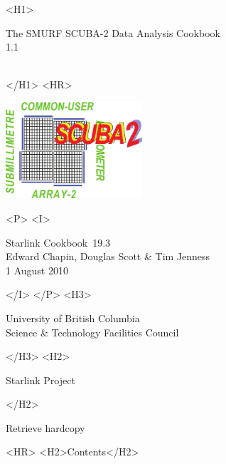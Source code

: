 \documentclass[twoside,11pt]{article}
\newcommand{\stardoccategory}  {Starlink Cookbook}
\newcommand{\stardocsource}    {sc\stardocnumber}
\newcommand{\stardocnumber}    {19.3}
\newcommand{\stardocauthors}   {Edward Chapin, Douglas Scott \& Tim Jenness}
\newcommand{\stardocdate}      {1 August 2010}
\newcommand{\stardoctitle}     {The SMURF SCUBA-2 Data Analysis Cookbook}
\newcommand{\stardocversion}   {1.1}
\newcommand{\stardocmanual}    {\ }
\newcommand{\htmladdnormallink}[2]{#1}
\newcommand{\htmladdimg}[1]{}
\newcommand{\htmlref}[2]{#1}
\newcommand{\htmladdtonavigation}[1]{}
\newcommand{\xlabel}[1]{}
\renewcommand{\_}{\texttt{\symbol{95}}}
\begin{document}
\begin{htmlonly}
   \xlabel{}
   \begin{rawhtml} <H1> \end{rawhtml}
      \stardoctitle\\
      \stardocversion\\
      \stardocmanual
   \begin{rawhtml} </H1> <HR> \end{rawhtml}

\includegraphics[width=2.0in]{sc19_logo}

   \begin{rawhtml} <P> <I> \end{rawhtml}
   \stardoccategory\ \stardocnumber \\
   \stardocauthors \\
   \stardocdate
   \begin{rawhtml} </I> </P> <H3> \end{rawhtml}
      \htmladdnormallink{University of British Columbia}
                        {http://www.ubc.ca} \\
      \htmladdnormallink{Science \& Technology Facilities Council}
                        {http://www.scitech.ac.uk} \\
   \begin{rawhtml} </H3> <H2> \end{rawhtml}
      \htmladdnormallink{Starlink Project}{http://www.starlink.ac.uk/}
   \begin{rawhtml} </H2> \end{rawhtml}
   \htmladdnormallink{\htmladdimg{source.gif} Retrieve hardcopy}
      {http://www.starlink.ac.uk/cgi-bin/hcserver?\stardocsource}\\

  \label{stardoccontents}
  \begin{rawhtml}
    <HR>
    <H2>Contents</H2>
  \end{rawhtml}
  \htmladdtonavigation{\htmlref{\htmladdimg{contents_motif.gif}}
        {stardoccontents}}


\end{htmlonly}
\end{document}
